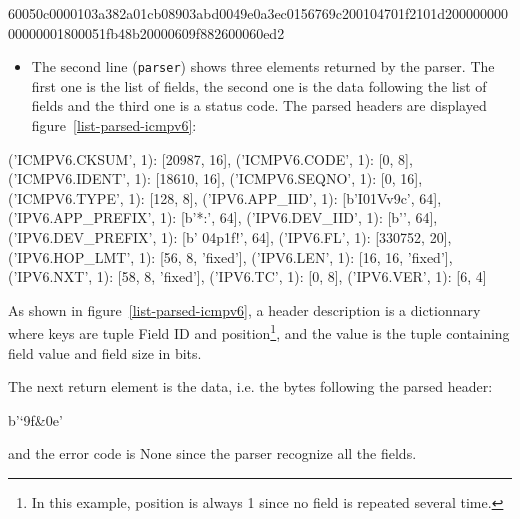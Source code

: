 \begin{termc}[backgroundcolor=\color{palerod}, basicstyle=\ttfamily\tiny, escapechar=@]
60050c0000103a382a01cb08903abd0049e0a3ec0156769c200104701f2101d20000000000000001800051fb48b20000609f882600060ed2
\end{termc}

\begin{itemize}
    \item The second line (\texttt{parser}) shows three elements returned by the parser. The first one is the list of fields, the second one is the data following the list of fields and the third one is a status code. The parsed headers are displayed figure~\ref{list-parsed-icmpv6}:
\end{itemize}

\begin{termc}[backgroundcolor=\color{palerod}, basicstyle=\ttfamily\small, escapechar=@, label=list-parsed-icmpv6, caption={Parsed IPv6/ICMPv6 header fields}]
{('ICMPV6.CKSUM', 1): [20987, 16],
 ('ICMPV6.CODE', 1): [0, 8],
 ('ICMPV6.IDENT', 1): [18610, 16],
 ('ICMPV6.SEQNO', 1): [0, 16],
 ('ICMPV6.TYPE', 1): [128, 8],
 ('IPV6.APP_IID', 1): [b'I\xec\x01Vv\x9c', 64],
 ('IPV6.APP_PREFIX', 1): [b'*\xcb{}:\xbd{}', 64],
 ('IPV6.DEV_IID', 1): [b'', 64],
 ('IPV6.DEV_PREFIX', 1): [b' \x04p\x1f!', 64],
 ('IPV6.FL', 1): [330752, 20],
 ('IPV6.HOP_LMT', 1): [56, 8, 'fixed'],
 ('IPV6.LEN', 1): [16, 16, 'fixed'],
 ('IPV6.NXT', 1): [58, 8, 'fixed'],
 ('IPV6.TC', 1): [0, 8],
 ('IPV6.VER', 1): [6, 4]}
\end{termc}
\begin{itemize}

As shown in figure~\vref{list-parsed-icmpv6}, a header description is a dictionnary where keys are tuple Field ID and position\footnote{In this example, position is always 1 since no field is repeated several time.}, and the value is the tuple containing field value and field size in bits.
\end{itemize}

\begin{itemize}
 The next return element is the data, i.e. the bytes following the parsed header:
\end{itemize}

\begin{termc}[backgroundcolor=\color{palerod}, basicstyle=\ttfamily\small, escapechar=@]
b'`\x9f&\x0e'
\end{termc}
\begin{itemize}
and the error code is None since the parser recognize all the fields.
\end{itemize}

